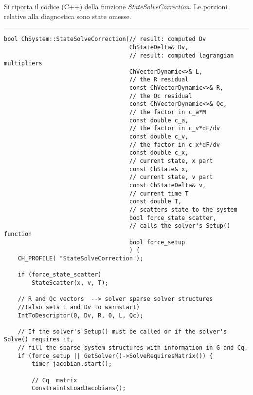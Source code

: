 Si riporta il codice (C++) della funzione \textit{StateSolveCorrection}. Le porzioni relative alla diagnostica sono state omesse. 


\noindent\rule{\textwidth}{1pt}\newline
\begin{verbatim}
bool ChSystem::StateSolveCorrection(// result: computed Dv
                                    ChStateDelta& Dv,
                                    // result: computed lagrangian multipliers
                                    ChVectorDynamic<>& L,         
                                    // the R residual
                                    const ChVectorDynamic<>& R,
                                    // the Qc residual
                                    const ChVectorDynamic<>& Qc,  
                                    // the factor in c_a*M
                                    const double c_a,      
                                    // the factor in c_v*dF/dv
                                    const double c_v, 
                                    // the factor in c_x*dF/dv
                                    const double c_x,   
                                    // current state, x part
                                    const ChState& x,             
                                    // current state, v part
                                    const ChStateDelta& v,        
                                    // current time T
                                    const double T,               
                                    // scatters state to the system
                                    bool force_state_scatter,     
                                    // calls the solver's Setup() function
                                    bool force_setup              
                                    ) {
    CH_PROFILE( "StateSolveCorrection");

    if (force_state_scatter)
        StateScatter(x, v, T);

    // R and Qc vectors  --> solver sparse solver structures  
    //(also sets L and Dv to warmstart)
    IntToDescriptor(0, Dv, R, 0, L, Qc);

    // If the solver's Setup() must be called or if the solver's Solve() requires it,
    // fill the sparse system structures with information in G and Cq.
    if (force_setup || GetSolver()->SolveRequiresMatrix()) {
        timer_jacobian.start();

        // Cq  matrix
        ConstraintsLoadJacobians();


\end{verbatim}
